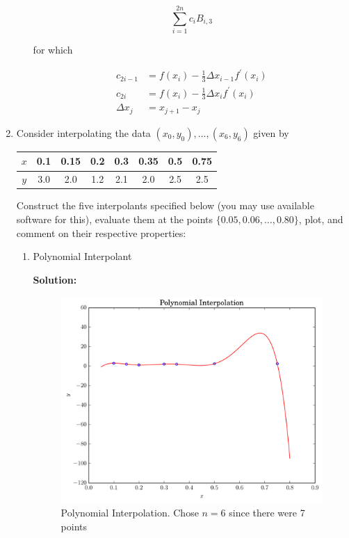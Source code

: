 \documentclass[12pt]{article}
\begin{document}
\begin{enumerate}
\begin{itemize}
  \[
      \sum_{i=1}^{2n}c_{i}B_{i,3}
  \]

  for which

  \begin{align*}
      c_{2i-1} &= f(x_{i}) - \frac{1}{3}\Delta x_{i-1}f^{\prime}(x_{i})\\
      c_{2i} &= f(x_{i}) - \frac{1}{3}\Delta x_{i}f^{\prime}(x_{i})\\
      \Delta x_{j} &= x_{j+1} - x_{j}
  \end{align*}
\end{itemize}


\item Consider interpolating the data $\left(x_{0}, y_{0}\right),\ldots,\left(x_{6}, y_{6}\right)$
given by

\begin{table}[H]
  \centering
  \begin{tabular}{| c | c | c | c | c | c | c | c |}
    $x$ & 0.1 & 0.15 & 0.2 & 0.3 & 0.35 & 0.5 & 0.75\\
    \hline
    $y$ & 3.0 & 2.0 & 1.2 & 2.1 & 2.0 & 2.5 & 2.5
  \end{tabular}
\end{table}

Construct the five interpolants specified below (you may use available software
for this), evaluate them at the points $\{ 0.05, 0.06,\ldots,0.80\}$, plot, and
comment on their respective properties:

\begin{enumerate}
  \item Polynomial Interpolant

  {\bf Solution:}

\begin{figure}[H]
\centering
\includegraphics[width=.75\textwidth]{poly_plot.pdf}
\caption{Polynomial Interpolation. Chose $n = 6$ since there were 7 points}
\end{figure}


\end{enumerate}
\end{enumerate}
\end{document}
